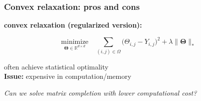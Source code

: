 \documentclass[compress,
mathserif,wide,%
]{beamer}
\begin{document}
\begin{frame}
\frametitle{Convex relaxation: pros and cons}


  {

\begin{varblock}[\textwidth]{}
\textbf{convex relaxation (regularized version):}
  \vspace{-2em}
\begin{center}
\[
   \underset{\bm{\Theta}\in\mathbb{R}^{d\times d}}{\text{minimize}}\quad  \sum_{(i,j)\in\Omega}\big(\Theta_{i,j}-Y_{i,j}\big)^{2}  +\lambda{\|\bm{\Theta}\|_{*}}
\]  
\end{center}
\end{varblock}
}

{
\vfill
\vspace{1em}

\begin{varblock}[\textwidth]{}
\centering
     often achieve statistical optimality \\ \pause
   \alert{{\bf Issue: }}  expensive in computation/memory
\end{varblock}
}

\end{frame}



\begin{frame}[plain]
  
\vfill

\centering
  {\large \em Can we solve matrix completion with lower computational cost?}
  
\vfill

\end{frame}
\end{document}
